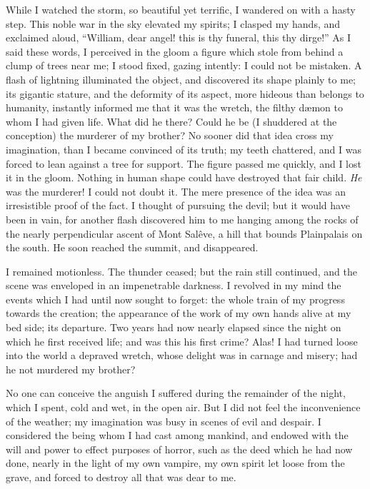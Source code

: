 While I watched the storm, so beautiful
yet terrific, I wandered on with a
hasty step. This noble war in the sky
elevated my spirits; I clasped my hands,
and exclaimed aloud, ``William, dear
angel! this is thy funeral, this thy
dirge!'' As I said these words, I perceived
in the gloom a figure which
stole from behind a clump of trees near
me; I stood fixed, gazing intently: I
could not be mistaken. A flash of
lightning illuminated the object, and
discovered its shape plainly to me;
its gigantic stature, and the deformity
of its aspect, more hideous than belongs
to humanity, instantly informed
me that it was the wretch, the filthy
dæmon to whom I had given life.
What did he there? Could he be (I
shuddered at the conception) the
murderer of my brother? No sooner did
that idea cross my imagination, than I
became convinced of its truth; my
teeth chattered, and I was forced to
lean against a tree for support. The
figure passed me quickly, and I lost
it in the gloom. Nothing in human
shape could have destroyed that fair
child. \emph{He} was the murderer! I could
not doubt it. The mere presence of
the idea was an irresistible proof of the
fact. I thought of pursuing the devil;
but it would have been in vain, for
another flash discovered him to me
hanging among the rocks of the nearly
perpendicular ascent of Mont Salêve,
a hill that bounds Plainpalais on the
south. He soon reached the summit,
and disappeared.

I remained motionless. The thunder
ceased; but the rain still continued,
and the scene was enveloped in an impenetrable
darkness. I revolved in my
mind the events which I had until now
sought to forget: the whole train of
my progress towards the creation; the
appearance of the work of my own
hands alive at my bed side; its departure.
Two years had now nearly
elapsed since the night on which he
first received life; and was this his
first crime? Alas! I had turned loose
into the world a depraved wretch, whose
delight was in carnage and misery;
had he not murdered my brother?

No one can conceive the anguish I
suffered during the remainder of the
night, which I spent, cold and wet, in
the open air. But I did not feel the
inconvenience of the weather; my imagination
was busy in scenes of evil and
despair. I considered the being whom
I had cast among mankind, and endowed
with the will and power to effect
purposes of horror, such as the deed
which he had now done, nearly in the
light of my own vampire, my own spirit
let loose from the grave, and forced
to destroy all that was dear to me.


